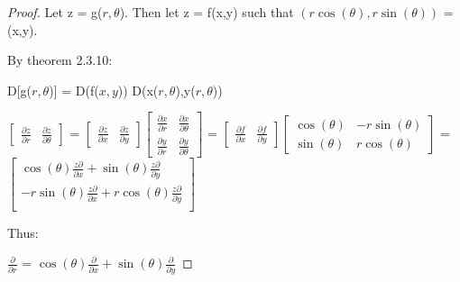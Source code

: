     \begin{proof}
        Let z = g($r,\theta$). Then let z = f(x,y)
        such that $(r\cos(\theta),r\sin(\theta))$ = (x,y).
        
        By {\color{red} theorem 2.3.10}:

        \hspace{0.2cm}
        D[g($r,\theta$)] = D(f($x,y$)) D(x($r,\theta$),y($r,\theta$))
        
        \hspace{0.2cm}
        $
        \begin{bmatrix}
            \frac{\partial z}{\partial r} & \frac{\partial z}{\partial \theta} 
        \end{bmatrix}
        $
        =
        $
        \begin{bmatrix}
            \frac{\partial z}{\partial x} & \frac{\partial z}{\partial y}
        \end{bmatrix}
        \begin{bmatrix}
            \frac{\partial x}{\partial r} & \frac{\partial x}{\partial \theta} \\
            \frac{\partial y}{\partial r} & \frac{\partial y}{\partial \theta}
        \end{bmatrix}
        $
        =
        $
        \begin{bmatrix}
            \frac{\partial f}{\partial x} & \frac{\partial f}{\partial y}
        \end{bmatrix}
        \begin{bmatrix}
            \scriptstyle \cos(\theta) & \scriptstyle -r\sin(\theta) \\
            \scriptstyle \sin(\theta) & \scriptstyle r\cos(\theta)
        \end{bmatrix}
        $
        =
        $
        \begin{bmatrix}
            \scriptstyle \cos(\theta) \frac{z\partial}{\partial x}
                + \sin(\theta) \frac{z\partial}{\partial y} \\
            \scriptstyle -r \sin(\theta) \frac{z\partial}{\partial x}
                + r \cos(\theta) \frac{z\partial}{\partial y} \\
        \end{bmatrix}
        $

        Thus:

        \hspace{0.5cm}
        $\frac{\partial}{\partial r}$
        = $\cos(\theta) \frac{\partial}{\partial x}
            + \sin(\theta) \frac{\partial}{\partial y}$


\end{proof}
